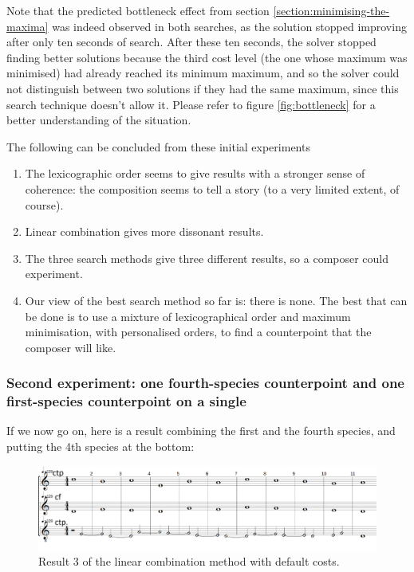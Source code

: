 Note that the predicted bottleneck effect from section \ref{section:minimising-the-maxima} was indeed observed in both searches, as the solution stopped improving after only ten seconds of search. After these ten seconds, the solver stopped finding better solutions because the third cost level (the one whose maximum was minimised) had already reached its minimum maximum, and so the solver could not distinguish between two solutions if they had the same maximum, since this search technique doesn't allow it. Please refer to figure \ref{fig:bottleneck} for a better understanding of the situation.

The following can be concluded from these initial experiments
\begin{enumerate}
    \item The lexicographic order seems to give results with a stronger sense of coherence: the composition seems to tell a story (to a very limited extent, of course).
    \item Linear combination gives more dissonant results.
    \item The three search methods give three different results, so a composer could experiment.
    \item Our view of the best search method so far is: there is none. The best that can be done is to use a mixture of lexicographical order and maximum minimisation, with personalised orders, to find a counterpoint that the composer will like.
\end{enumerate}
\subsubsection{Second experiment: one fourth-species counterpoint and one first-species counterpoint on a single \cf}

If we now go on, here is a result combining the first and the fourth species, and putting the 4th species at the bottom:
\begin{figure}[h]
    \centering
    \includegraphics[width=1\textwidth]{Images/Experiments/linear-combination-4sp.png}
    \caption{Result 3 of the linear combination method with default costs.}
    \label{fig:combili-4sp}
\end{figure}

